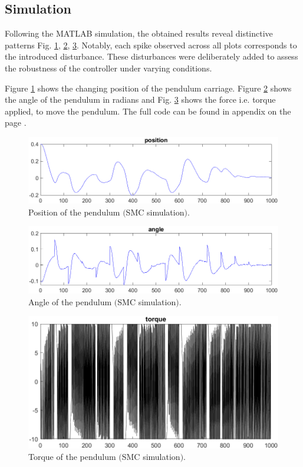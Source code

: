 \subsection{Simulation}

Following the MATLAB simulation, the obtained results reveal distinctive patterns Fig. \ref{posSmc}, \ref{angSmc}, \ref{torSmc}. Notably, each spike observed across all plots corresponds to the introduced disturbance. These disturbances were deliberately added to assess the robustness of the controller under varying conditions.

Figure \ref{posSmc} shows the changing position of the pendulum carriage. Figure \ref{angSmc} shows the angle of the pendulum in radians and Fig. \ref{torSmc} shows the force i.e. torque applied, to move the pendulum. The full code can be found in appendix on the page \pageref{smcSim}.

\begin{figure}[!tbh]
	\centering
	\includegraphics[width=150mm]{obr/posSmc.png}
	\caption{Position of the pendulum $($SMC simulation$)$.}\label{posSmc}
\end{figure}

\begin{figure}[!tbh]
	\centering
	\includegraphics[width=150mm]{obr/angSmc.png}
	\caption{Angle of the pendulum $($SMC simulation$)$.}\label{angSmc}
\end{figure}

\begin{figure}[!tbh]
	\centering
	\includegraphics[width=150mm]{obr/torSmc.png}
	\caption{Torque of the pendulum $($SMC simulation$)$.}\label{torSmc}
\end{figure}

